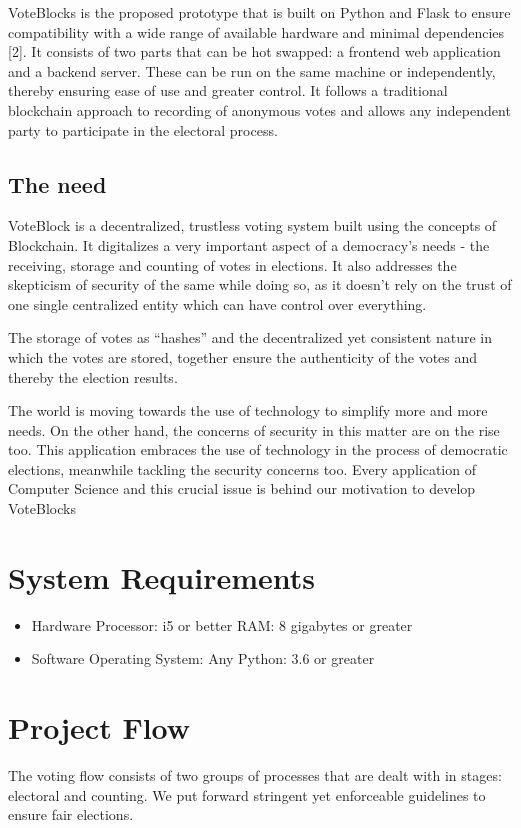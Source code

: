 \documentclass{article}
\begin{document}
    VoteBlocks is the proposed prototype that is built on Python and Flask to ensure compatibility with a wide range of available hardware and minimal dependencies [2]. It consists of two parts that can be hot swapped: a frontend web application and a backend server. These can be run on the same machine or independently, thereby ensuring ease of use and greater control. It follows a traditional blockchain approach to recording of anonymous votes and allows any independent party to participate in the electoral process.    
    
    \subsection{The need}
    VoteBlock is a decentralized, trustless voting system built using the concepts of Blockchain. It digitalizes a very important aspect of a democracy’s needs - the receiving, storage and counting of votes in elections. It also addresses the skepticism of security of the same while doing so, as it doesn’t rely on the trust of one single centralized entity which can have control over everything. 
    
    The storage of votes as “hashes” and the decentralized yet consistent nature in which the votes are stored, together ensure the authenticity of the votes and thereby the election results.
    
    The world is moving towards the use of technology to simplify more and more needs. On the other hand, the concerns of security in this matter are on the rise too. This application embraces the use of technology in the process of democratic elections, meanwhile tackling the security concerns too. Every application of Computer Science and this crucial issue is behind our motivation to develop VoteBlocks
    
    \section{System Requirements}
    \begin{itemize}
        \item Hardware
        \subitem Processor: i5 or better
        \subitem RAM: 8 gigabytes or greater
        \item Software
        \subitem Operating System: Any
        \subitem Python: 3.6 or greater
    \end{itemize}
    \section{Project Flow}
    The voting flow consists of two groups of processes that are dealt with in stages: electoral and counting. We put forward stringent yet enforceable guidelines to ensure fair elections.
\end{document}
